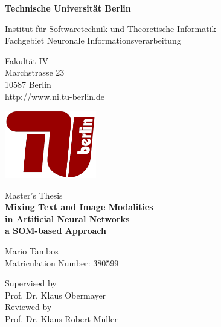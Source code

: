 \documentclass[a4paper]{standalone}
\begin{document}
\thispagestyle{empty}
\begin{center}

\vspace*{1.4cm}
{\LARGE \textbf{Technische Universität Berlin}}

\vspace{0.5cm}

{\large Institut für Softwaretechnik und Theoretische Informatik\\[1mm]}
{\large Fachgebiet Neuronale Informationsverarbeitung\\[5mm]}

Fakultät IV\\
Marchstrasse 23\\
10587 Berlin\\
\url{http://www.ni.tu-berlin.de}\\

\vspace*{1cm}

\includegraphics[width=4cm]{images/TU-Berlin-Logo.png}

\vspace*{0.8cm}

{\LARGE Master's Thesis}\\

\vspace{0.8cm}
{\LARGE \textbf{Mixing Text and Image Modalities}}\\
\vspace*{0.2cm}
{\LARGE \textbf{in Artificial Neural Networks}}\\
\vspace*{0.2cm}
{\Large \textbf{a SOM-based Approach}}\\
\vspace*{0.8cm}

{\LARGE Mario Tambos}
\\
\vspace*{0.5cm}
Matriculation Number: 380599\\
\date{\today} %
\vspace*{1.0cm}

Supervised by\\
Prof. Dr. Klaus Obermayer\\
\vspace*{0.5cm}
Reviewed by\\
Prof. Dr. Klaus-Robert Müller
\vspace{3cm}


\end{center}
\end{document}
